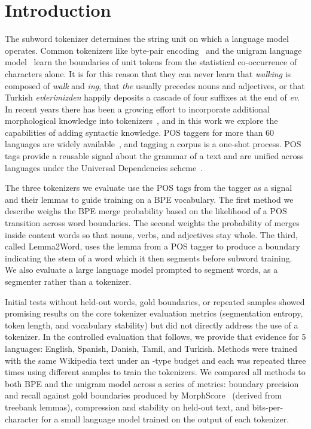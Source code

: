 \section{Introduction}\label{sec:intro}

The subword tokenizer determines the string unit on which a language model operates.
Common tokenizers like byte-pair encoding~\cite{sennrich2016bpe} and the unigram language model~\cite{kudo2018subword} learn the boundaries of unit tokens from the statistical co-occurrence of characters alone.
It is for this reason that they can never learn that \emph{walking} is composed of \emph{walk} and \emph{ing}, that \emph{the} usually precedes nouns and adjectives, or that Turkish \emph{evlerimizden} happily deposits a cascade of four suffixes at the end of \emph{ev}.
In recent years there has been a growing effort to incorporate additional morphological knowledge into tokenizers~\cite{jabbar2023morphpiece,asgari2025morphbpe,hofmann2021superbizarre}, and in this work we explore the capabilities of adding syntactic knowledge.
POS taggers for more than 60 languages are widely available~\cite{qi2020stanza}, and tagging a corpus is a one-shot process.
POS tags provide a reusable signal about the grammar of a text and are unified across languages under the Universal Dependencies scheme~\cite{nivre2020ud}.

The three tokenizers we evaluate use the POS tags from the tagger as a signal and their lemmas to guide training on a BPE vocabulary.
The first method we describe weighs the BPE merge probability based on the likelihood of a POS transition across word boundaries.
The second weights the probability of merges inside content words so that nouns, verbs, and adjectives stay whole.
The third, called Lemma2Word, uses the lemma from a POS tagger to produce a boundary indicating the stem of a word which it then segments before subword training.
We also evaluate a large language model prompted to segment words, as a segmenter rather than a tokenizer.

Initial tests without held-out words, gold boundaries, or repeated samples showed promising results on the core tokenizer evaluation metrics (segmentation entropy, token length, and vocabulary stability) but did not directly address the use of a tokenizer.
In the controlled evaluation that follows, we provide that evidence for 5 languages: English, Spanish, Danish, Tamil, and Turkish.
Methods were trained with the same Wikipedia text under an \nVocabBudget-type budget and each was repeated three times using different samples to train the tokenizers.
We compared all methods to both BPE and the unigram model across a series of metrics: boundary precision and recall against gold boundaries produced by MorphScore~\cite{arnett2025morphscore} (derived from treebank lemmas), compression and stability on held-out text, and bits-per-character for a small language model trained on the output of each tokenizer.


